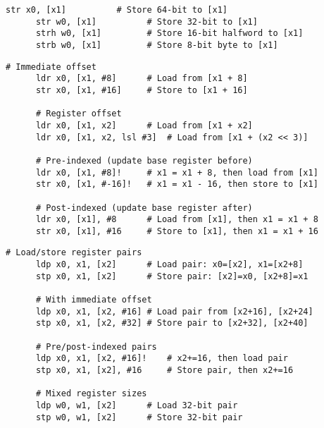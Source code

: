   \begin{definition}
    \begin{lstlisting}[language=arm]
      str x0, [x1]          # Store 64-bit to [x1]
      str w0, [x1]          # Store 32-bit to [x1]
      strh w0, [x1]         # Store 16-bit halfword to [x1]
      strb w0, [x1]         # Store 8-bit byte to [x1]
    \end{lstlisting}
  \end{definition}

  \begin{definition}
    \begin{lstlisting}[language=arm]
      # Immediate offset
      ldr x0, [x1, #8]      # Load from [x1 + 8]
      str x0, [x1, #16]     # Store to [x1 + 16]
      
      # Register offset
      ldr x0, [x1, x2]      # Load from [x1 + x2]
      ldr x0, [x1, x2, lsl #3]  # Load from [x1 + (x2 << 3)]
      
      # Pre-indexed (update base register before)
      ldr x0, [x1, #8]!     # x1 = x1 + 8, then load from [x1]
      str x0, [x1, #-16]!   # x1 = x1 - 16, then store to [x1]
      
      # Post-indexed (update base register after)
      ldr x0, [x1], #8      # Load from [x1], then x1 = x1 + 8
      str x0, [x1], #16     # Store to [x1], then x1 = x1 + 16
    \end{lstlisting}
  \end{definition}

  \begin{definition}
    \begin{lstlisting}[language=arm]
      # Load/store register pairs
      ldp x0, x1, [x2]      # Load pair: x0=[x2], x1=[x2+8]
      stp x0, x1, [x2]      # Store pair: [x2]=x0, [x2+8]=x1
      
      # With immediate offset
      ldp x0, x1, [x2, #16] # Load pair from [x2+16], [x2+24]
      stp x0, x1, [x2, #32] # Store pair to [x2+32], [x2+40]
      
      # Pre/post-indexed pairs
      ldp x0, x1, [x2, #16]!    # x2+=16, then load pair
      stp x0, x1, [x2], #16     # Store pair, then x2+=16
      
      # Mixed register sizes
      ldp w0, w1, [x2]      # Load 32-bit pair
      stp w0, w1, [x2]      # Store 32-bit pair
    \end{lstlisting}
  \end{definition}

